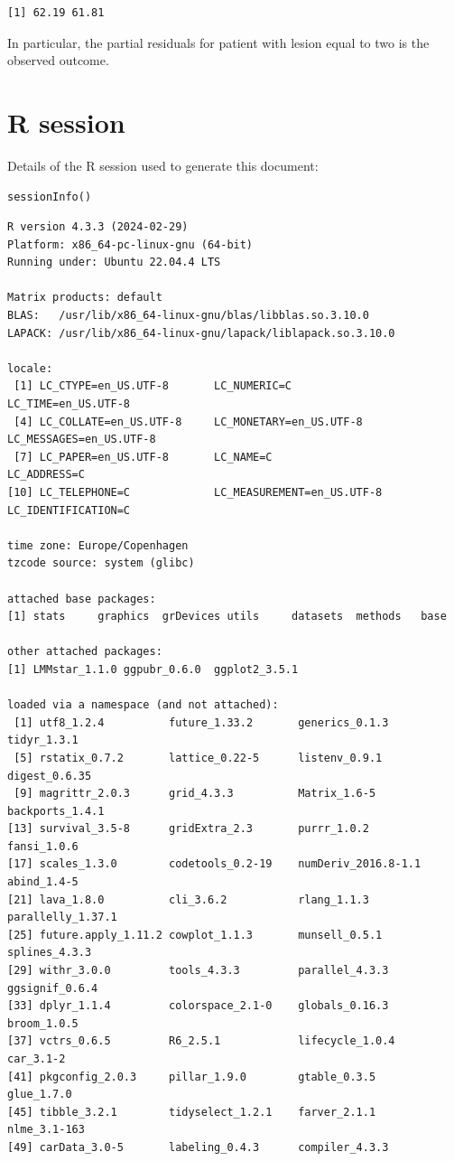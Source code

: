 \documentclass[12pt]{article}
\begin{document}
\begin{verbatim}
[1] 62.19 61.81
\end{verbatim}


In particular, the partial residuals for patient with lesion equal to
two is the observed outcome.

\clearpage

\section{R session}
\label{sec:org1a2cb97}
Details of the R session used to generate this document:
\lstset{language=r,label= ,caption= ,captionpos=b,numbers=none}
\begin{lstlisting}
sessionInfo()
\end{lstlisting}

\begin{verbatim}
R version 4.3.3 (2024-02-29)
Platform: x86_64-pc-linux-gnu (64-bit)
Running under: Ubuntu 22.04.4 LTS

Matrix products: default
BLAS:   /usr/lib/x86_64-linux-gnu/blas/libblas.so.3.10.0 
LAPACK: /usr/lib/x86_64-linux-gnu/lapack/liblapack.so.3.10.0

locale:
 [1] LC_CTYPE=en_US.UTF-8       LC_NUMERIC=C               LC_TIME=en_US.UTF-8       
 [4] LC_COLLATE=en_US.UTF-8     LC_MONETARY=en_US.UTF-8    LC_MESSAGES=en_US.UTF-8   
 [7] LC_PAPER=en_US.UTF-8       LC_NAME=C                  LC_ADDRESS=C              
[10] LC_TELEPHONE=C             LC_MEASUREMENT=en_US.UTF-8 LC_IDENTIFICATION=C       

time zone: Europe/Copenhagen
tzcode source: system (glibc)

attached base packages:
[1] stats     graphics  grDevices utils     datasets  methods   base     

other attached packages:
[1] LMMstar_1.1.0 ggpubr_0.6.0  ggplot2_3.5.1

loaded via a namespace (and not attached):
 [1] utf8_1.2.4          future_1.33.2       generics_0.1.3      tidyr_1.3.1        
 [5] rstatix_0.7.2       lattice_0.22-5      listenv_0.9.1       digest_0.6.35      
 [9] magrittr_2.0.3      grid_4.3.3          Matrix_1.6-5        backports_1.4.1    
[13] survival_3.5-8      gridExtra_2.3       purrr_1.0.2         fansi_1.0.6        
[17] scales_1.3.0        codetools_0.2-19    numDeriv_2016.8-1.1 abind_1.4-5        
[21] lava_1.8.0          cli_3.6.2           rlang_1.1.3         parallelly_1.37.1  
[25] future.apply_1.11.2 cowplot_1.1.3       munsell_0.5.1       splines_4.3.3      
[29] withr_3.0.0         tools_4.3.3         parallel_4.3.3      ggsignif_0.6.4     
[33] dplyr_1.1.4         colorspace_2.1-0    globals_0.16.3      broom_1.0.5        
[37] vctrs_0.6.5         R6_2.5.1            lifecycle_1.0.4     car_3.1-2          
[41] pkgconfig_2.0.3     pillar_1.9.0        gtable_0.3.5        glue_1.7.0         
[45] tibble_3.2.1        tidyselect_1.2.1    farver_2.1.1        nlme_3.1-163       
[49] carData_3.0-5       labeling_0.4.3      compiler_4.3.3
\end{verbatim}

\clearpage
\end{document}
